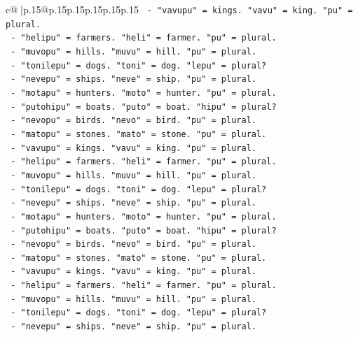 \documentclass{article}
\begin{document}
{\begin{supertabular}{c@{$\;$}|p{.15\linewidth}@{}p{.15\linewidth}p{.15\linewidth}p{.15\linewidth}p{.15\linewidth}p{.15\linewidth}}
{{{\texttt{        {-} "vavupu" = kings. "vavu" = king. "pu" = plural.} \\
\texttt{        {-} "helipu" = farmers. "heli" = farmer. "pu" = plural.} \\
\texttt{        {-} "muvopu" = hills. "muvu" = hill. "pu" = plural.} \\
\texttt{        {-} "tonilepu" = dogs. "toni" = dog. "lepu" = plural?} \\
\texttt{        {-} "nevepu" = ships. "neve" = ship. "pu" = plural.} \\
\texttt{        {-} "motapu" = hunters. "moto" = hunter. "pu" = plural.} \\
\texttt{        {-} "putohipu" = boats. "puto" = boat. "hipu" = plural?} \\
\texttt{        {-} "nevopu" = birds. "nevo" = bird. "pu" = plural.} \\
\texttt{        {-} "matopu" = stones. "mato" = stone. "pu" = plural.} \\
\texttt{        {-} "vavupu" = kings. "vavu" = king. "pu" = plural.} \\
\texttt{        {-} "helipu" = farmers. "heli" = farmer. "pu" = plural.} \\
\texttt{        {-} "muvopu" = hills. "muvu" = hill. "pu" = plural.} \\
\texttt{        {-} "tonilepu" = dogs. "toni" = dog. "lepu" = plural?} \\
\texttt{        {-} "nevepu" = ships. "neve" = ship. "pu" = plural.} \\
\texttt{        {-} "motapu" = hunters. "moto" = hunter. "pu" = plural.} \\
\texttt{        {-} "putohipu" = boats. "puto" = boat. "hipu" = plural?} \\
\texttt{        {-} "nevopu" = birds. "nevo" = bird. "pu" = plural.} \\
\texttt{        {-} "matopu" = stones. "mato" = stone. "pu" = plural.} \\
\texttt{        {-} "vavupu" = kings. "vavu" = king. "pu" = plural.} \\
\texttt{        {-} "helipu" = farmers. "heli" = farmer. "pu" = plural.} \\
\texttt{        {-} "muvopu" = hills. "muvu" = hill. "pu" = plural.} \\
\texttt{        {-} "tonilepu" = dogs. "toni" = dog. "lepu" = plural?} \\
\texttt{        {-} "nevepu" = ships. "neve" = ship. "pu" = plural.} \\
}}}
\end{supertabular}}
\end{document}
